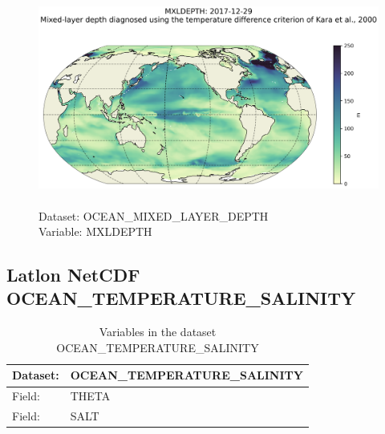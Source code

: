 \begin{figure}[H]
\centering
\includegraphics[scale=0.5]{../images/plots/latlon_plots/Ocean_Mixed_Layer_Depth/MXLDEPTH.png}
\caption{\\Dataset: OCEAN\_MIXED\_LAYER\_DEPTH\\Variable: MXLDEPTH}
\label{tab:table-OCEAN_MIXED_LAYER_DEPTH_MXLDEPTH-Plot}
\end{figure}
\pagebreak
\subsection{Latlon NetCDF OCEAN\_TEMPERATURE\_SALINITY}
\newp
\begin{longtable}{|p{}|p{}|}
\caption{Variables in the dataset OCEAN\_TEMPERATURE\_SALINITY}
\label{tab:table-OCEAN_TEMPERATURE_SALINITY-fields} \\ 
\hline \endhead \hline \endfoot
\rowcolor{lightgray} \textbf{Dataset:} & \textbf{OCEAN\_TEMPERATURE\_SALINITY} \\ \hline
Field: &THETA \\ \hline
Field: &SALT \\ \hline
\end{longtable}

\pagebreak
